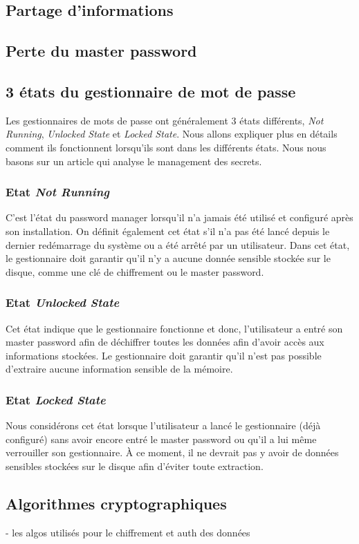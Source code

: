 \subsection{Partage d'informations}
\subsection{Perte du master password}
\subsection{3 états du gestionnaire de mot de passe}
Les gestionnaires de mots de passe ont généralement 3 états différents, \textit{Not Running}, \textit{Unlocked State} et \textit{Locked State}. Nous allons expliquer plus en détails comment ils fonctionnent lorsqu'ils sont dans les différents états. Nous nous basons sur un article qui analyse le management des secrets\cite{iseexploit}.
\subsubsection{Etat \textit{Not Running}}
C'est l'état du password manager lorsqu'il n'a jamais été utilisé et configuré après son installation. On définit également cet état s'il n'a pas été lancé depuis le dernier redémarrage du système ou a été arrêté par un utilisateur. Dans cet état, le gestionnaire doit garantir qu'il n'y a aucune donnée sensible stockée sur le disque, comme une clé de chiffrement ou le master password.
\subsubsection{Etat \textit{Unlocked State}}
Cet état indique que le gestionnaire fonctionne et donc, l'utilisateur a entré son master password afin de déchiffrer toutes les données afin d'avoir accès aux informations stockées. Le gestionnaire doit garantir qu'il n'est pas possible d'extraire aucune information sensible de la mémoire.
\subsubsection{Etat \textit{Locked State}}
Nous considérons cet état lorsque l'utilisateur a lancé le gestionnaire (déjà configuré) sans avoir encore entré le master password ou qu'il a lui même verrouiller son gestionnaire. À ce moment, il ne devrait pas y avoir de données sensibles stockées sur le disque afin d'éviter toute extraction. 
\subsection{Algorithmes cryptographiques}
- les algos utilisés pour le chiffrement et auth des données 

